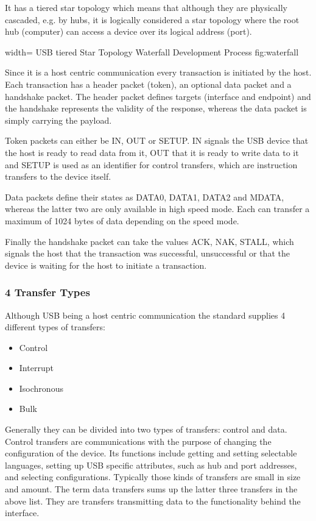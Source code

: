 It has a tiered star topology which means that although they are physically cascaded, e.g. by hubs, it is logically considered a star topology where the 
root hub (computer) can access a device over its logical address (port).

 {width=\textwidth}%
 {USB tiered Star Topology \cite{USBTOPOLOGY}}%
 {Waterfall Development Process}%
 {fig:waterfall}%
 
Since it is a host centric communication every transaction is initiated by the host. Each transaction has a header packet (token), an optional data 
packet and a handshake packet. The header packet defines targets (interface and endpoint) and the handshake represents the validity of the response, 
whereas the data packet is simply carrying the payload.

Token packets can either be IN, OUT or SETUP. IN signals the USB device that the host is ready to read data from it, OUT that it is ready to write data 
to it and SETUP is used as an identifier for control transfers, which are instruction transfers to the device itself.

Data packets define their states as DATA0, DATA1, DATA2 and MDATA, whereas the latter two are only available in high speed mode. Each can transfer a 
maximum of 1024 bytes of data depending on the speed mode.

Finally the handshake packet can take the values ACK, NAK, STALL, which signals the host that the transaction was successful, unsuccessful or that the 
device is waiting for the host to initiate a transaction.%

\subsubsection{4 Transfer Types}

Although USB being a host centric communication the standard supplies 4 different types of transfers: 

\begin{itemize}
 \item Control
 \item Interrupt
 \item Isochronous
 \item Bulk
\end{itemize}

Generally they can be divided into two types of transfers: control and data. Control transfers are communications with the purpose of changing the 
configuration of the device. Its functions include getting and setting selectable languages, setting up USB specific attributes, such as hub and port 
addresses, and selecting configurations. Typically those kinds of transfers are small in size and amount. 
The term data transfers sums up the latter three transfers in the above list. They are transfers transmitting data to the functionality 
behind the interface.%


